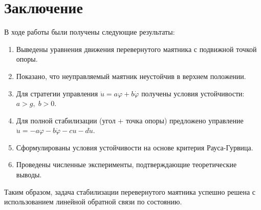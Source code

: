 \section{Заключение}

В ходе работы были получены следующие результаты:

\begin{enumerate}
	\item Выведены уравнения движения перевернутого маятника с подвижной точкой опоры.
	\item Показано, что неуправляемый маятник неустойчив в верхнем положении.
	\item Для стратегии управления \(\ddot{u} = a\varphi + b\dot{\varphi}\) получены условия устойчивости: \(a > g,\; b > 0\).
	\item Для полной стабилизации (угол + точка опоры) предложено управление \(\ddot{u} = -a\varphi - b\dot{\varphi} - cu - d\dot{u}\).
	\item Сформулированы условия устойчивости на основе критерия Рауса-Гурвица.
	\item Проведены численные эксперименты, подтверждающие теоретические выводы.
\end{enumerate}

Таким образом, задача стабилизации перевернутого маятника успешно решена с использованием линейной обратной связи по состоянию.